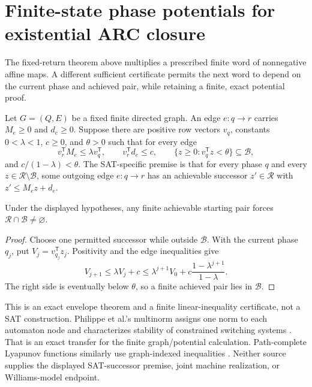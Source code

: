 \section{Finite-state phase potentials for existential ARC closure}
The fixed-return theorem above multiplies a prescribed finite word of
nonnegative affine maps.  A different sufficient certificate permits the
next word to depend on the current phase and achieved pair, while retaining a
finite, exact potential proof.

Let \(G=(Q,E)\) be a fixed finite directed graph.  An edge
\(e:q\to r\) carries \(M_e\ge0\) and \(d_e\ge0\).  Suppose there are
positive row vectors \(v_q\), constants \(0<\lambda<1\), \(c\ge0\), and
\(\theta>0\) such that for every edge
\[
 v_r^{\mathsf T}M_e\le\lambda v_q^{\mathsf T},
 \qquad
 v_r^{\mathsf T}d_e\le c,
 \qquad
 \{z\ge0:v_q^{\mathsf T}z<\theta\}\subseteq\mathcal B,
\]
and \(c/(1-\lambda)<\theta\).  The SAT-specific premise is that for every
phase \(q\) and every \(z\in\mathcal R\setminus\mathcal B\), some outgoing
edge \(e:q\to r\) has an achievable successor
\(z'\in\mathcal R\) with \(z'\le M_ez+d_e\).

\begin{theorem}
Under the displayed hypotheses, any finite achievable starting pair forces
\(\mathcal R\cap\mathcal B\ne\varnothing\).
\end{theorem}
\begin{proof}
Choose one permitted successor while outside \(\mathcal B\).  With the
current phase \(q_j\), put \(V_j=v_{q_j}^{\mathsf T}z_j\).  Positivity and the
edge inequalities give
\[
 V_{j+1}\le\lambda V_j+c
 \le \lambda^{j+1}V_0+
       c\frac{1-\lambda^{j+1}}{1-\lambda}.
\]
The right side is eventually below \(\theta\), so a finite achieved pair
lies in \(\mathcal B\).
\end{proof}

This is an exact envelope theorem and a finite linear-inequality certificate,
not a SAT construction.  Philippe et al.'s multinorm assigns one norm to
each automaton node and characterizes stability of constrained switching
systems \cite[Definition~2.2, Proposition~2.3, Theorem~2.4]{arc0007PhilippeMultinorm}.
That is an exact transfer for the finite graph/potential calculation.
Path-complete Lyapunov functions similarly use graph-indexed inequalities
\cite{arc0007AhmadiPathComplete}.  Neither source supplies the displayed
SAT-successor premise, joint machine realization, or Williams-model endpoint.

